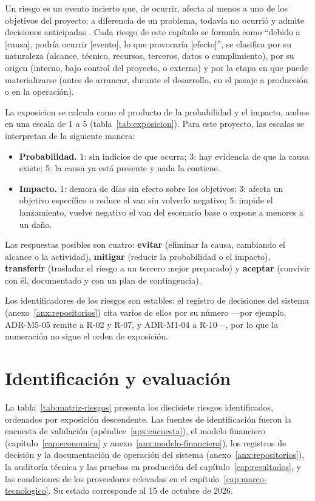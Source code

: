 Un riesgo es un evento incierto que, de ocurrir, afecta al menos a uno
de los objetivos del proyecto; a diferencia de un problema, todavía no
ocurrió y admite decisiones anticipadas \citep{pmi2021}. Cada riesgo de
este capítulo se formula como ``debido a [causa], podría ocurrir
[evento], lo que provocaría [efecto]'', se clasifica por su naturaleza
(alcance, técnico, recursos, terceros, datos o cumplimiento), por su
origen (interno, bajo control del proyecto, o externo) y por la etapa en
que puede materializarse (antes de arrancar, durante el desarrollo, en
el pasaje a producción o en la operación).

La \gls{exposicion} se calcula como el producto de la probabilidad y el
impacto, ambos en una escala de 1 a 5
(tabla~\ref{tab:exposicion}). Para este proyecto, las escalas se
interpretan de la siguiente manera:

\begin{itemize}
    \item \textbf{Probabilidad.} 1: sin indicios de que ocurra; 3: hay
          evidencia de que la causa existe; 5: la causa ya está presente y
          nada la contiene.
    \item \textbf{Impacto.} 1: demora de días sin efecto sobre los
          objetivos; 3: afecta un objetivo específico o reduce el
          \gls{van} sin volverlo negativo; 5: impide el lanzamiento,
          vuelve negativo el \gls{van} del escenario base o expone a
          menores a un daño.
\end{itemize}

Las respuestas posibles son cuatro: \textbf{evitar} (eliminar la causa,
cambiando el alcance o la actividad), \textbf{mitigar} (reducir la
probabilidad o el impacto), \textbf{transferir} (trasladar el riesgo a un
tercero mejor preparado) y \textbf{aceptar} (convivir con él,
documentado y con un plan de contingencia).

Los identificadores de los riesgos son estables: el registro de
decisiones del sistema (anexo~\ref{anx:repositorios}) cita varios de
ellos por su número ---por ejemplo, ADR-M5-05 remite a R-02 y R-07, y
ADR-M1-04 a R-10---, por lo que la numeración no sigue el orden de
exposición.

\section{Identificación y evaluación}

La tabla~\ref{tab:matriz-riesgos} presenta los diecisiete riesgos
identificados, ordenados por exposición descendente. Las fuentes de
identificación fueron la encuesta de validación
(apéndice~\ref{apx:encuesta}), el modelo financiero
(capítulo~\ref{cap:economica} y anexo~\ref{anx:modelo-financiero}), los
registros de decisión y la documentación de operación del sistema
(anexo~\ref{anx:repositorios}), la auditoría técnica y las pruebas en
producción del capítulo~\ref{cap:resultados}, y las condiciones de los
proveedores relevadas en el capítulo~\ref{cap:marco-tecnologico}. Su
estado corresponde al 15 de octubre de 2026.

